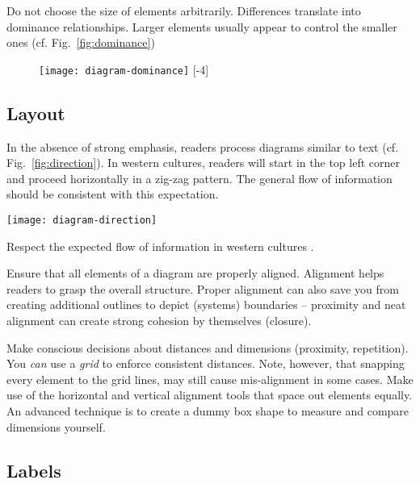 Do not choose the size of elements arbitrarily. Differences translate into dominance relationships. Larger elements usually appear to control the smaller ones (cf. Fig.~\ref{fig:dominance})

\begin{figure}[t]
\centering
\texttt{[image: diagram-dominance]}
[-4\baselineskip]
\end{figure}


\subsection{Layout}

In the absence of strong emphasis, readers process diagrams similar to text (cf. Fig.~\ref{fig:direction}). In western cultures, readers will start in the top left corner and proceed horizontally in a zig-zag pattern. The general flow of information should be consistent with this expectation.

\begin{marginfigure}
\centering
\texttt{[image: diagram-direction]}
\caption{\label{fig:direction} Respect the expected flow of information in western cultures \cite{Carter12}.}%
\end{marginfigure}


Ensure that all elements of a diagram are properly aligned. Alignment helps readers to grasp the overall structure. Proper alignment can also save you from creating additional outlines to depict (systems) boundaries – proximity and neat alignment can create strong cohesion by themselves (closure).

Make conscious decisions about distances and dimensions (proximity, repetition). You \emph{can} use a \emph{grid} to enforce consistent distances. Note, however, that snapping every element to the grid lines, may still cause mis-alignment in some cases. Make use of the horizontal and vertical alignment tools that space out elements equally. An advanced technique is to create a dummy box shape to measure and compare dimensions yourself.

\subsection{Labels}


